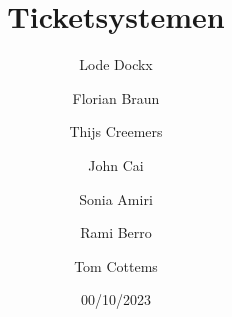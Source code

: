 \documentclass[12pt, a4paper]{article}
\title{Ticketsystemen}
\author{Lode Dockx \and Florian Braun \and Thijs Creemers \and John Cai \and Sonia Amiri \and Rami Berro \and Tom Cottems}
\date{00/10/2023}
\begin{document}
	\begin{titlepage}
		\maketitle
	\end{titlepage}

    
    
\end{document}
